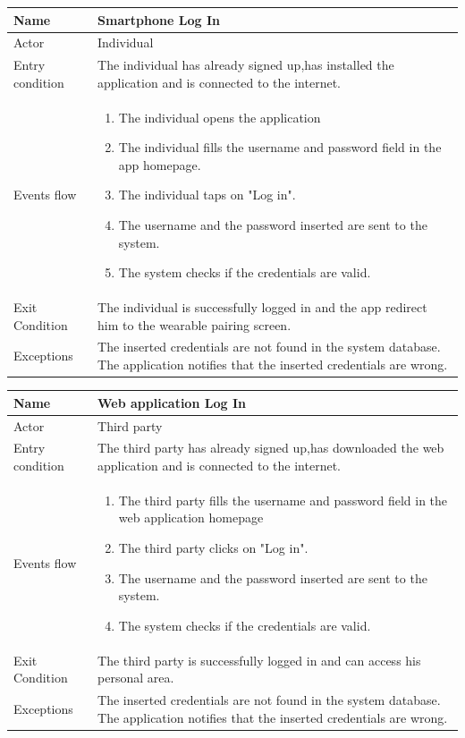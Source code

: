 \begin{table}[p]
\centering
\begin{tabular}{|l|p{11cm}|}
    \hline
    Name & Smartphone Log In
    \\ \hline
    Actor & Individual
    \\ \hline 
    Entry condition & The individual has already signed up,has installed the application and is connected to the internet.
    \\ \hline
    Events flow &
    \begin{enumerate}
    \item The individual opens the application
    \item The individual fills the username and password field in the app homepage.
    \item The individual taps on "Log in".
    \item The username and the password inserted are sent to the system.
    \item The system checks if the credentials are valid.
    \end{enumerate}
     \\ \hline
     Exit Condition & The individual is successfully logged in and the app redirect him to the wearable pairing screen.
     \\
    \hline
    Exceptions &
	The inserted credentials are not found in the system database.
   The application notifies that the inserted credentials are wrong.
      \\
    \hline
\end{tabular}
\end{table}

\begin{table}[p]
\centering
\begin{tabular}{|l|p{11cm}|}
    \hline
    Name & Web application Log In
    \\ \hline
    Actor & Third party
    \\ \hline 
    Entry condition & The third party has already signed up,has downloaded the web application and is connected to the internet.
    \\ \hline
    Events flow &
    \begin{enumerate}
    \item The third party fills the username and password field in the web application homepage
    \item The third party clicks on "Log in".
    \item The username and the password inserted are sent to the system.
    \item The system checks if the credentials are valid.
    \end{enumerate}
     \\ \hline
     Exit Condition & The third party is successfully logged in and can access his personal area.
     \\
    \hline
    Exceptions &
    The inserted credentials are not found in the system database.  
   The application notifies that the inserted credentials are wrong.
      \\
    \hline
\end{tabular}
\end{table}


